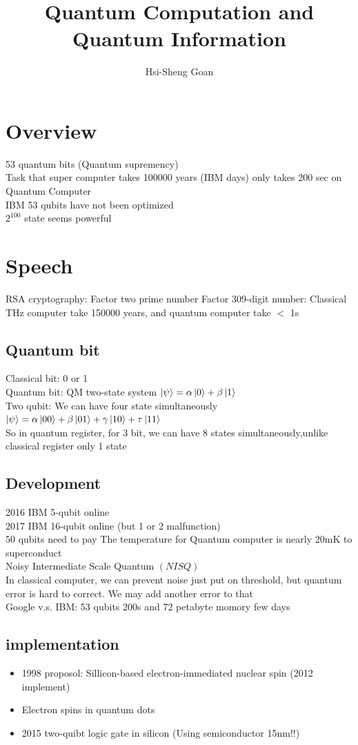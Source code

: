 \documentclass[]{article}
\title{\textbf{Quantum Computation and Quantum Information}}
\author{Hsi-Sheng Goan}
\date{}
\theoremstyle{nonumberplain}
\begin{document}
\maketitle
\section{Overview}%
\label{sec:overview}
	53 quantum bits (Quantum supremency)\\
	Task that super computer takes 100000 years (IBM days) only takes 200 sec on Quantum Computer\\
	IBM 53 qubits have not been optimized\\
	$2^{100}$ state seems powerful \\
\section{Speech}
RSA cryptography: Factor two prime number
Factor 309-digit number: Classical THz computer take 150000 years, and quantum computer take $<$ 1s
\subsection{Quantum bit}
Classical bit: 0 or 1\\
Quantum bit: QM two-state system $\ket{\psi}=\alpha\ket{0}+\beta\ket{1}$\\
Two qubit: We can have four state simultaneously $\ket{\psi}=\alpha\ket{00}+\beta\ket{01}+\gamma\ket{10}+\tau\ket{11}$\\
So in quantum register, for 3 bit, we can have 8 states simultaneously,unlike classical register only 1 state
\subsection{Development}
2016 IBM 5-qubit online\\
2017 IBM 16-qubit online (but 1 or 2 malfunction)\\ 
50 qubits need to pay
The temperature for Quantum computer is nearly 20mK to superconduct\\
Noisy Intermediate Scale Quantum $(NISQ)$\\
In classical computer, we can prevent noise just put on threshold, but quantum error is hard to correct. We may add another error to that\\
Google v.s. IBM: 53 qubits 200s and 72 petabyte momory few days
\subsection{implementation}
\begin{itemize}
\item 1998 proposol: Sillicon-based electron-immediated nuclear spin (2012 implement)
\item  Electron spins in quantum dots
\item	2015 two-quibt logic gate in silicon (Using semiconductor 15nm!!)
\end{itemize}
\end{document}
